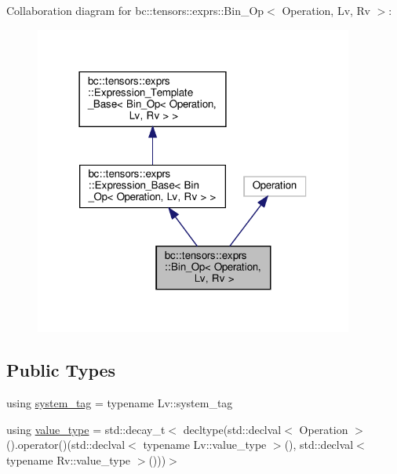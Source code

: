 Collaboration diagram for bc\+:\+:tensors\+:\+:exprs\+:\+:Bin\+\_\+\+Op$<$ Operation, Lv, Rv $>$\+:\nopagebreak
\begin{figure}[H]
\begin{center}
\leavevmode
\includegraphics[width=297pt]{structbc_1_1tensors_1_1exprs_1_1Bin__Op__coll__graph}
\end{center}
\end{figure}
\subsection*{Public Types}
\begin{DoxyCompactItemize}
\item 
using \hyperlink{structbc_1_1tensors_1_1exprs_1_1Bin__Op_a5e39aa2bb60266199be2fc701b0edaaf}{system\+\_\+tag} = typename Lv\+::system\+\_\+tag
\item 
using \hyperlink{structbc_1_1tensors_1_1exprs_1_1Bin__Op_a3928519ff927c73f5dd82ed3d4d00d6c}{value\+\_\+type} = std\+::decay\+\_\+t$<$ decltype(std\+::declval$<$ Operation $>$().operator()(std\+::declval$<$ typename Lv\+::value\+\_\+type $>$(), std\+::declval$<$ typename Rv\+::value\+\_\+type $>$()))$>$
\end{DoxyCompactItemize}
